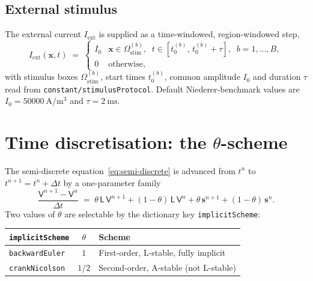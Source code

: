 \documentclass[11pt,a4paper]{article}
\newcommand{\Iext}{I_{\text{ext}}}
\newcommand{\Lop}{\mathsf{L}}
\newcommand{\code}[1]{\texttt{\small #1}}
\begin{document}
\subsection{External stimulus}

The external current $\Iext$ is supplied as a time-windowed,
region-windowed step,
\begin{equation}
  \Iext(\mathbf{x}, t) \;=\;
  \begin{cases}
    I_{0} & \mathbf{x} \in \Omega_{\text{stim}}^{(b)},
            \;\; t \in [t_{0}^{(b)},\, t_{0}^{(b)} + \tau],
            \;\; b = 1, \dots, B, \\
    0     & \text{otherwise},
  \end{cases}
\end{equation}
with stimulus boxes $\Omega_{\text{stim}}^{(b)}$, start times
$t_{0}^{(b)}$, common amplitude $I_{0}$ and duration $\tau$ read from
\code{constant/stimulusProtocol}. Default Niederer-benchmark values are
$I_{0} = \SI{50000}{\ampere\per\meter\cubed}$ and
$\tau = \SI{2}{\milli\second}$.

\section{Time discretisation: the $\theta$-scheme}

The semi-discrete equation~\eqref{eq:semi-discrete} is advanced from
$t^{n}$ to $t^{n+1} = t^{n} + \Delta t$ by a one-parameter family
\begin{equation}
  \frac{\mathsf{V}^{n+1} - \mathsf{V}^{n}}{\Delta t}
   \;=\;
   \theta\, \Lop\, \mathsf{V}^{n+1}
   + (1-\theta)\, \Lop\, \mathsf{V}^{n}
   + \theta\, \mathbf{s}^{n+1}
   + (1-\theta)\, \mathbf{s}^{n}.
   \label{eq:theta}
\end{equation}
Two values of $\theta$ are selectable by the dictionary key
\code{implicitScheme}:
\begin{center}
\begin{tabular}{@{}lcl@{}}
\toprule
\code{implicitScheme} & $\theta$ & Scheme \\
\midrule
\code{backwardEuler} & $1$   & First-order, L-stable, fully implicit \\
\code{crankNicolson} & $1/2$ & Second-order, A-stable (not L-stable) \\
\bottomrule
\end{tabular}
\end{center}
\end{document}
